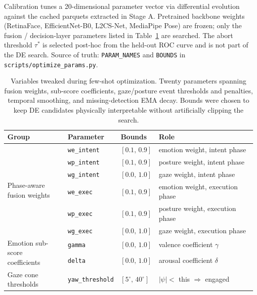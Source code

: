 \documentclass[11pt]{article}
\begin{document}
\noindent
Calibration tunes a 20-dimensional parameter vector via differential
evolution against the cached parquets extracted in Stage A. Pretrained
backbone weights (RetinaFace, EfficientNet-B0, L2CS-Net, MediaPipe Pose)
are frozen; only the fusion / decision-layer parameters listed in
Table~\ref{tab:search_space} are searched. The abort threshold $\tau^{*}$
is selected post-hoc from the held-out ROC curve and is not part of the
DE search. Source of truth: \texttt{PARAM\_NAMES} and \texttt{BOUNDS} in
\texttt{scripts/optimize\_params.py}.

\begin{table}[h]
\centering
\caption{Variables tweaked during few-shot optimization. Twenty parameters
spanning fusion weights, sub-score coefficients, gaze/posture event
thresholds and penalties, temporal smoothing, and missing-detection EMA
decay. Bounds were chosen to keep DE candidates physically interpretable
without artificially clipping the search.}
\label{tab:search_space}
\small
\setlength{\tabcolsep}{6pt}
\renewcommand{\arraystretch}{1.15}
\begin{tabular}{l l l l}
\toprule
Group & Parameter & Bounds & Role \\
\midrule
\multirow{6}{*}{\parbox{2.5cm}{Phase-aware\\fusion weights}}
  & \texttt{we\_intent}            & $[0.1,\,0.9]$ & emotion weight, intent phase \\
  & \texttt{wp\_intent}            & $[0.1,\,0.9]$ & posture weight, intent phase \\
  & \texttt{wg\_intent}            & $[0.0,\,1.0]$ & gaze weight, intent phase \\
  & \texttt{we\_exec}              & $[0.1,\,0.9]$ & emotion weight, execution phase \\
  & \texttt{wp\_exec}              & $[0.1,\,0.9]$ & posture weight, execution phase \\
  & \texttt{wg\_exec}              & $[0.0,\,1.0]$ & gaze weight, execution phase \\
\midrule
\multirow{2}{*}{\parbox{2.5cm}{Emotion sub-score\\coefficients}}
  & \texttt{gamma}                 & $[0.0,\,1.0]$ & valence coefficient $\gamma$ \\
  & \texttt{delta}                 & $[0.0,\,1.0]$ & arousal coefficient $\delta$ \\
\midrule
\multirow{2}{*}{\parbox{2.5cm}{Gaze cone\\thresholds}}
  & \texttt{yaw\_threshold}        & $[5^\circ,\,40^\circ]$  & $|\psi| < $ this $\Rightarrow$ engaged \\

\end{tabular}
\end{table}
\end{document}
